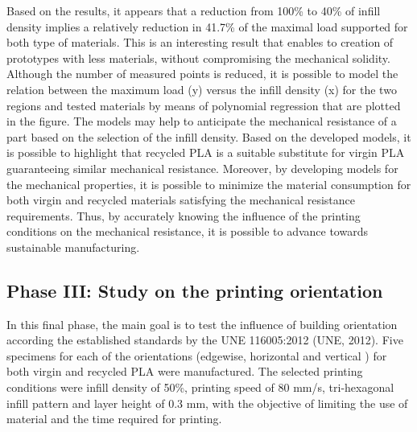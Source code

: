 \documentclass[conference,final,]{IEEEtran}
\begin{document}
Based on the results, it appears that a reduction from 100\% to 40\% of
infill density implies a relatively reduction in 41.7\% of the maximal
load supported for both type of materials. This is an interesting result
that enables to creation of prototypes with less materials, without
compromising the mechanical solidity. Although the number of measured
points is reduced, it is possible to model the relation between the
maximum load (y) versus the infill density (x) for the two regions and
tested materials by means of polynomial regression that are plotted in
the figure. The models may help to anticipate the mechanical resistance
of a part based on the selection of the infill density. Based on the
developed models, it is possible to highlight that recycled PLA is a
suitable substitute for virgin PLA guaranteeing similar mechanical
resistance. Moreover, by developing models for the mechanical
properties, it is possible to minimize the material consumption for both
virgin and recycled materials satisfying the mechanical resistance
requirements. Thus, by accurately knowing the influence of the printing
conditions on the mechanical resistance, it is possible to advance
towards sustainable manufacturing.

\hypertarget{phase-iii-study-on-the-printing-orientation}{%
\subsection{Phase III: Study on the printing
orientation}\label{phase-iii-study-on-the-printing-orientation}}

In this final phase, the main goal is to test the influence of building
orientation according the established standards by the UNE 116005:2012
(UNE, 2012). Five specimens for each of the orientations (edgewise,
horizontal and vertical ) for both virgin and recycled PLA were
manufactured. The selected printing conditions were infill density of
50\%, printing speed of 80 mm/s, tri-hexagonal infill pattern and layer
height of 0.3 mm, with the objective of limiting the use of material and
the time required for printing.
\end{document}
